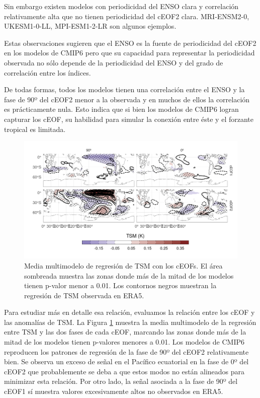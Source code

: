 \documentclass[12pt,oneside,a4paper]{reedthesis}
\begin{document}
Sin embargo existen modelos con periodicidad del ENSO clara y correlación relativamente alta que no tienen periodicidad del cEOF2 clara.
MRI-ENSM2-0, UKESM1-0-LL, MPI-ESM1-2-LR son algunos ejemplos.

Estas observaciones sugieren que el ENSO es la fuente de periodicidad del cEOF2 en los modelos de CMIP6 pero que su capacidad para representar la periodicidad observada no sólo depende de la periodicidad del ENSO y del grado de correlación entre los índices.

De todas formas, todos los modelos tienen una correlación entre el ENSO y la fase de 90º del cEOF2 menor a la observada y en muchos de ellos la correlación es prácticamente nula.
Esto indica que si bien los modelos de CMIP6 logran capturar los cEOF, su habilidad para simular la conexión entre éste y el forzante tropical es limitada.



\begin{figure}

{\centering \includegraphics{figures/50-cmip6/sst-mmm-1} 

}

\caption{Media multimodelo de regresión de TSM con los cEOFs. El área sombreada muestra las zonas donde más de la mitad de los modelos tienen p-valor menor a 0.01. Los contornos negros muestran la regresión de TSM observada en ERA5.}\label{fig:sst-mmm}
\end{figure}

Para estudiar más en detalle esa relación, evaluamos la relación entre los cEOF y las anomalías de TSM.
La Figura \ref{fig:sst-mmm} muestra la media multimodelo de la regresión entre TSM y las dos fases de cada cEOF, marcando las zonas donde más de la mitad de los modelos tienen p-valores menores a 0.01.
Los modelos de CMIP6 reproducen los patrones de regresión de la fase de 90º del cEOF2 relativamente bien.
Se observa un exceso de señal en el Pacífico ecuatorial en la fase de 0º del cEOF2 que probablemente se deba a que estos modos no están alineados para minimizar esta relación.
Por otro lado, la señal asociada a la fase de 90º del cEOF1 sí muestra valores excesivamente altos no observados en ERA5.
\end{document}
